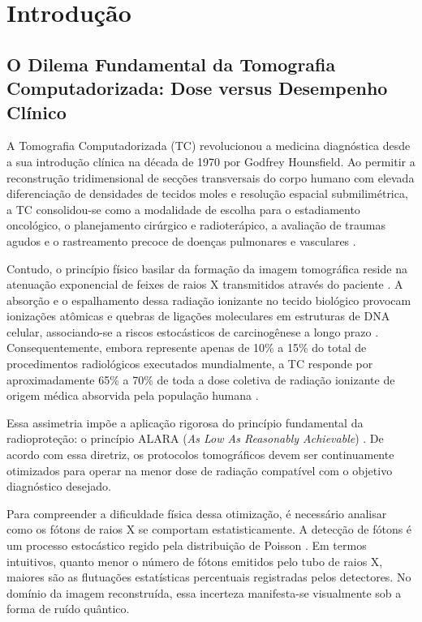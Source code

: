 \chapter{Introdução}
\label{chap:introducao}

\section{O Dilema Fundamental da Tomografia Computadorizada: Dose versus Desempenho Clínico}
\label{sec:dilema_dose}

A Tomografia Computadorizada (TC) revolucionou a medicina diagnóstica desde a sua introdução clínica na década de 1970 por Godfrey Hounsfield. Ao permitir a reconstrução tridimensional de secções transversais do corpo humano com elevada diferenciação de densidades de tecidos moles e resolução espacial submilimétrica, a TC consolidou-se como a modalidade de escolha para o estadiamento oncológico, o planejamento cirúrgico e radioterápico, a avaliação de traumas agudos e o rastreamento precoce de doenças pulmonares e vasculares \cite{mccollough2026, seeram2015, bushberg2020}.

Contudo, o princípio físico basilar da formação da imagem tomográfica reside na atenuação exponencial de feixes de raios X transmitidos através do paciente \cite{attix1986}. A absorção e o espalhamento dessa radiação ionizante no tecido biológico provocam ionizações atômicas e quebras de ligações moleculares em estruturas de DNA celular, associando-se a riscos estocásticos de carcinogênese a longo prazo \cite{icrp103_2007}. Consequentemente, embora represente apenas de 10\% a 15\% do total de procedimentos radiológicos executados mundialmente, a TC responde por aproximadamente 65\% a 70\% de toda a dose coletiva de radiação ionizante de origem médica absorvida pela população humana \cite{iaea_5star_2026, mccollough2026}.

Essa assimetria impõe a aplicação rigorosa do princípio fundamental da radioproteção: o princípio ALARA (\emph{As Low As Reasonably Achievable}) \cite{icrp103_2007, anvisa_rdc611_2022, anvisa_in93_2021}. De acordo com essa diretriz, os protocolos tomográficos devem ser continuamente otimizados para operar na menor dose de radiação compatível com o objetivo diagnóstico desejado.

Para compreender a dificuldade física dessa otimização, é necessário analisar como os fótons de raios X se comportam estatisticamente. A detecção de fótons é um processo estocástico regido pela distribuição de Poisson \cite{knoll2010}. Em termos intuitivos, quanto menor o número de fótons emitidos pelo tubo de raios X, maiores são as flutuações estatísticas percentuais registradas pelos detectores. No domínio da imagem reconstruída, essa incerteza manifesta-se visualmente sob a forma de ruído quântico.

